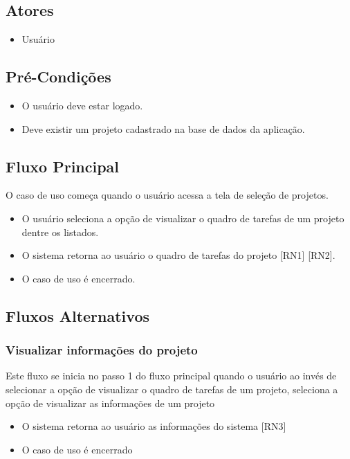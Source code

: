 \subsection{Atores}
\begin{itemize}
  \item Usuário 
\end{itemize}
\subsection{Pré-Condições}

\begin{itemize}
  \item O usuário deve estar logado.
  \item Deve existir um projeto cadastrado na base de dados da aplicação. 
\end{itemize}

\subsection{Fluxo Principal}
O caso de uso começa quando o usuário acessa a tela de seleção de projetos.

\begin{itemize}
  \item O usuário seleciona a opção de visualizar o quadro de tarefas de um projeto dentre os listados.
  \item O sistema retorna ao usuário o quadro de tarefas do projeto [RN1] [RN2].
  \item O caso de uso é encerrado. 
\end{itemize}

\subsection{Fluxos Alternativos}

\subsubsection{Visualizar informações do projeto}
Este fluxo se inicia no passo 1 do fluxo principal quando o usuário ao invés de selecionar a opção de visualizar o quadro de tarefas de um projeto, seleciona a opção de visualizar as informações de um projeto

\begin{itemize}
  \item O sistema retorna ao usuário as informações do sistema [RN3]
  \item O caso de uso é encerrado
\end{itemize}


